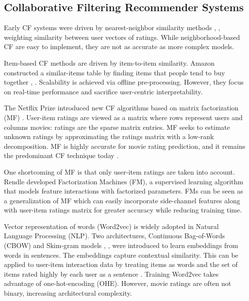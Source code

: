 \subsection{Collaborative Filtering Recommender Systems}

Early CF systems were driven by nearest-neighbor similarity methods \cite{herlocker1999algorithmic}, \cite{smith2017two}, weighting similarity between user vectors of ratings. While neighborhood-based CF are easy to implement, they are not as accurate as more complex models.

Item-based CF methods are driven by item-to-item similarity. Amazon constructed a similar-items table by finding items that people tend to buy together \cite{linden2003amazon}, \cite{smith2017two}. Scalability is achieved via offline pre-processing. However, they focus on real-time performance and sacrifice user-centric interpretability. 

The Netflix Prize introduced new CF algorithms based on matrix factorization (MF) \cite{funk2006netflix}. User-item ratings are viewed as a matrix where rows represent users and columns movies: ratings are the sparse matrix entries. MF seeks to estimate unknown ratings by approximating the ratings matrix with a low-rank decomposition. MF is highly accurate for movie rating prediction, and it remains the predominant CF technique today \cite{koren2008factorization}. 

One shortcoming of MF is that only user-item ratings are taken into account. Rendle \cite{rendle2012factorization} developed Factorization Machines (FM), a supervised learning algorithm that models feature interactions with factorized parameters.  FMs can be seen as a generalization of MF which can easily incorporate side-channel features along with user-item ratings matrix for greater accuracy while reducing training time.

Vector representation of words (Word2vec) is widely adopted in Natural Language Processing (NLP). Two  architectures, Continuous Bag-of-Words (CBOW) and Skim-gram models \cite{mikolov2013efficient},  \cite{mikolov2013distributed}, \cite{rong2014word2vec} were introduced to learn embeddings from words in sentences. The embeddings capture contextual similarity. This can be applied to user-item interaction data by treating items as words and the set of items rated highly by each user as a sentence \cite{ozsoy2016word}. Training Word2vec takes advantage of one-hot-encoding (OHE). However, movie ratings are often not binary, increasing architectural complexity.

